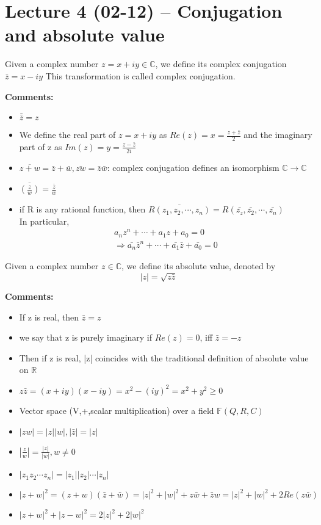 \section{Lecture 4 (02-12) -- {Conjugation and absolute value}}
\begin{definition}{}
Given a complex number $z=x+iy \in \mathbb{C}$, we define its complex conjugation $ \bar{z}=x-iy $ This transformation is called complex conjugation. 
\end{definition}
\textbf{Comments:}
\begin{itemize}
\item $ \bar{\bar{z}}=z $
\item  We define the real part of $ z=x+iy $ as $ Re(z)=x=\frac{z+\bar{z}}{2} $ and the imaginary part of z as $ Im(z)=y=\frac{z-\bar{z}}{2i} $ 
\item  $ \overline{z+w}=\bar{z}+\bar{w}, \bar{zw}=\bar{z}\bar{w} $: complex conjugation defines an isomorphism $ \mathbb{C}\rightarrow\mathbb{C} $  
\item $\overline{(\frac{z}{w})}=\frac{\bar{z}}{\bar{w}} $
\item if R is any rational function, then $ \overline{R(z_1,z_2,\cdots,z_n)}=R(\bar{z_z},\bar{z_2},\cdots,\bar{z_n}) $
\\In particular, \begin{align*}{}{}
a_nz^n+\cdots+a_1z+a_0=0\\
\Rightarrow \bar{a_n}\bar{z}^n+\cdots+\bar{a_1}\bar{z}+\bar{a_0}=0
\end{align*} 
\end{itemize}
\begin{definition}{}
Given a complex number $ z \in \mathbb{C} $, we define its absolute value, denoted by $$ |z|=\sqrt{z\bar{z}} $$
\end{definition}
\textbf{Comments:}
\begin{itemize}
\item If z is real, then $ \bar{z}=z $
\item we say that z is purely imaginary if $ Re(z)=0 $, iff $ \bar{z}=-z $ 
\item Then if z is real, |z| coincides with the traditional definition of absolute value on $\mathbb{R}$
\item $ z\bar{z}=(x+iy)(x-iy)=x^2-{(iy)}^2=x^2+y^2\geq0 $ 
\item Vector space (V,+,scalar multiplication) over a field $ \mathbb{F}(Q,R,C) $ 
\item $ |zw|=|z||w|,|\bar{z}|=|z| $
\item $ |\frac{z}{w}|=\frac{|z|}{|w|},w\neq0 $
\item $|z_1z_2\cdots z_n|=|z_1||z_2|\cdots |z_n|  $
\item ${|z+w|}^2=(z+w)(\bar{z}+\bar{w})={|z|}^2+{|w|}^2+z\bar{w}+\bar{z}w=|z|^2+|w|^2+2Re(z\bar{w}) $
\item $ {|z+w|}^2+{|z-w|}^2=2{|z|}^2+2{|w|}^2 $ 
\end{itemize}
